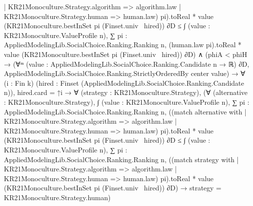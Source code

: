 \documentclass[10pt]{article}
\begin{document}
\begin{ReviewVerbatim}
                                              | KR21Monoculture.Strategy.algorithm => algorithm.law
                                              | KR21Monoculture.Strategy.human => human.law)
                                              pi).toReal *
                                          value (KR21Monoculture.bestInSet pi (Finset.univ \ hired)) ∂D ≤
                                    ∫ (value : KR21Monoculture.ValueProfile n),
                                      ∑ pi : AppliedModelingLib.SocialChoice.Ranking.Ranking n,
                                        (human.law pi).toReal *
                                          value (KR21Monoculture.bestInSet pi (Finset.univ \ hired)) ∂D) ∧
                        (phiA < phiH →
                          (∀ᵐ (value : AppliedModelingLib.SocialChoice.Ranking.Candidate n → ℝ) ∂D,
                              AppliedModelingLib.SocialChoice.Ranking.StrictlyOrderedBy center value) →
                            ∀ (i : Fin k) (hired : Finset (AppliedModelingLib.SocialChoice.Ranking.Candidate n)),
                              hired.card = ↑i →
                                ∀ (strategy : KR21Monoculture.Strategy),
                                  (∀ (alternative : KR21Monoculture.Strategy),
                                      ∫ (value : KR21Monoculture.ValueProfile n),
                                          ∑ pi : AppliedModelingLib.SocialChoice.Ranking.Ranking n,
                                            ((match alternative with
                                                  | KR21Monoculture.Strategy.algorithm => algorithm.law
                                                  | KR21Monoculture.Strategy.human => human.law)
                                                  pi).toReal *
                                              value (KR21Monoculture.bestInSet pi (Finset.univ \ hired)) ∂D ≤
                                        ∫ (value : KR21Monoculture.ValueProfile n),
                                          ∑ pi : AppliedModelingLib.SocialChoice.Ranking.Ranking n,
                                            ((match strategy with
                                                  | KR21Monoculture.Strategy.algorithm => algorithm.law
                                                  | KR21Monoculture.Strategy.human => human.law)
                                                  pi).toReal *
                                              value (KR21Monoculture.bestInSet pi (Finset.univ \ hired)) ∂D) →
                                    strategy = KR21Monoculture.Strategy.human)
\end{ReviewVerbatim}
\end{document}
